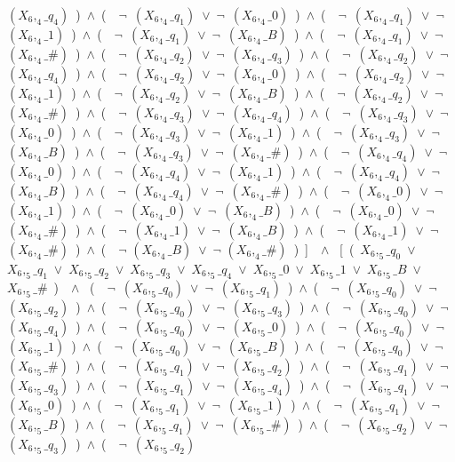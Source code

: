 ﻿\documentclass[a4paper,10pt]{article}
\begin{document}
$(X_6,_4\_q_4)$\ )\ $\wedge$\ (\ \ $\neg$\ $(X_6,_4\_q_1)$\ $\vee$\ $\neg$\ $(X_6,_4\_0)$\ )\ $\wedge$\ (\ \ $\neg$\ $(X_6,_4\_q_1)$\ $\vee$\ $\neg$\ $(X_6,_4\_1)$\ )\ $\wedge$\ (\ \ $\neg$\ $(X_6,_4\_q_1)$\ $\vee$\ $\neg$\ $(X_6,_4\_B)$\ )\ $\wedge$\ (\ \ $\neg$\ $(X_6,_4\_q_1)$\ $\vee$\ $\neg$\ $(X_6,_4\_\#)$\ )\ $\wedge$\ (\ \ $\neg$\ $(X_6,_4\_q_2)$\ $\vee$\ $\neg$\ $(X_6,_4\_q_3)$\ )\ $\wedge$\ (\ \ $\neg$\ $(X_6,_4\_q_2)$\ $\vee$\ $\neg$\ $(X_6,_4\_q_4)$\ )\ $\wedge$\ (\ \ $\neg$\ $(X_6,_4\_q_2)$\ $\vee$\ $\neg$\ $(X_6,_4\_0)$\ )\ $\wedge$\ (\ \ $\neg$\ $(X_6,_4\_q_2)$\ $\vee$\ $\neg$\ $(X_6,_4\_1)$\ )\ $\wedge$\ (\ \ $\neg$\ $(X_6,_4\_q_2)$\ $\vee$\ $\neg$\ $(X_6,_4\_B)$\ )\ $\wedge$\ (\ \ $\neg$\ $(X_6,_4\_q_2)$\ $\vee$\ $\neg$\ $(X_6,_4\_\#)$\ )\ $\wedge$\ (\ \ $\neg$\ $(X_6,_4\_q_3)$\ $\vee$\ $\neg$\ $(X_6,_4\_q_4)$\ )\ $\wedge$\ (\ \ $\neg$\ $(X_6,_4\_q_3)$\ $\vee$\ $\neg$\ $(X_6,_4\_0)$\ )\ $\wedge$\ (\ \ $\neg$\ $(X_6,_4\_q_3)$\ $\vee$\ $\neg$\ $(X_6,_4\_1)$\ )\ $\wedge$\ (\ \ $\neg$\ $(X_6,_4\_q_3)$\ $\vee$\ $\neg$\ $(X_6,_4\_B)$\ )\ $\wedge$\ (\ \ $\neg$\ $(X_6,_4\_q_3)$\ $\vee$\ $\neg$\ $(X_6,_4\_\#)$\ )\ $\wedge$\ (\ \ $\neg$\ $(X_6,_4\_q_4)$\ $\vee$\ $\neg$\ $(X_6,_4\_0)$\ )\ $\wedge$\ (\ \ $\neg$\ $(X_6,_4\_q_4)$\ $\vee$\ $\neg$\ $(X_6,_4\_1)$\ )\ $\wedge$\ (\ \ $\neg$\ $(X_6,_4\_q_4)$\ $\vee$\ $\neg$\ $(X_6,_4\_B)$\ )\ $\wedge$\ (\ \ $\neg$\ $(X_6,_4\_q_4)$\ $\vee$\ $\neg$\ $(X_6,_4\_\#)$\ )\ $\wedge$\ (\ \ $\neg$\ $(X_6,_4\_0)$\ $\vee$\ $\neg$\ $(X_6,_4\_1)$\ )\ $\wedge$\ (\ \ $\neg$\ $(X_6,_4\_0)$\ $\vee$\ $\neg$\ $(X_6,_4\_B)$\ )\ $\wedge$\ (\ \ $\neg$\ $(X_6,_4\_0)$\ $\vee$\ $\neg$\ $(X_6,_4\_\#)$\ )\ $\wedge$\ (\ \ $\neg$\ $(X_6,_4\_1)$\ $\vee$\ $\neg$\ $(X_6,_4\_B)$\ )\ $\wedge$\ (\ \ $\neg$\ $(X_6,_4\_1)$\ $\vee$\ $\neg$\ $(X_6,_4\_\#)$\ )\ $\wedge$\ (\ \ $\neg$ $(X_6,_4\_B)$\ $\vee$\ $\neg$ $(X_6,_4\_\#)$\ )\ ]\ \ $\wedge$ \ [\ (\ $X_6,_5\_q_0$\ $\vee$\ $X_6,_5\_q_1$\ $\vee$\ $X_6,_5\_q_2$\ $\vee$\ $X_6,_5\_q_3$\ $\vee$\ $X_6,_5\_q_4$\ $\vee$\ $X_6,_5\_0$\ $\vee$\ $X_6,_5\_1$\ $\vee$\ $X_6,_5\_B$\ $\vee$\ $X_6,_5\_\#$\ )\ \ $\wedge$ \ (\ \ $\neg$\ $(X_6,_5\_q_0)$\ $\vee$\ $\neg$\ $(X_6,_5\_q_1)$\ )\ $\wedge$\ (\ \ $\neg$\ $(X_6,_5\_q_0)$\ $\vee$\ $\neg$\ $(X_6,_5\_q_2)$\ )\ $\wedge$\ (\ \ $\neg$\ $(X_6,_5\_q_0)$\ $\vee$\ $\neg$\ $(X_6,_5\_q_3)$\ )\ $\wedge$\ (\ \ $\neg$\ $(X_6,_5\_q_0)$\ $\vee$\ $\neg$\ $(X_6,_5\_q_4)$\ )\ $\wedge$\ (\ \ $\neg$\ $(X_6,_5\_q_0)$\ $\vee$\ $\neg$\ $(X_6,_5\_0)$\ )\ $\wedge$\ (\ \ $\neg$\ $(X_6,_5\_q_0)$\ $\vee$\ $\neg$\ $(X_6,_5\_1)$\ )\ $\wedge$\ (\ \ $\neg$\ $(X_6,_5\_q_0)$\ $\vee$\ $\neg$\ $(X_6,_5\_B)$\ )\ $\wedge$\ (\ \ $\neg$\ $(X_6,_5\_q_0)$\ $\vee$\ $\neg$\ $(X_6,_5\_\#)$\ )\ $\wedge$\ (\ \ $\neg$\ $(X_6,_5\_q_1)$\ $\vee$\ $\neg$\ $(X_6,_5\_q_2)$\ )\ $\wedge$\ (\ \ $\neg$\ $(X_6,_5\_q_1)$\ $\vee$\ $\neg$\ $(X_6,_5\_q_3)$\ )\ $\wedge$\ (\ \ $\neg$\ $(X_6,_5\_q_1)$\ $\vee$\ $\neg$\ $(X_6,_5\_q_4)$\ )\ $\wedge$\ (\ \ $\neg$\ $(X_6,_5\_q_1)$\ $\vee$\ $\neg$\ $(X_6,_5\_0)$\ )\ $\wedge$\ (\ \ $\neg$\ $(X_6,_5\_q_1)$\ $\vee$\ $\neg$\ $(X_6,_5\_1)$\ )\ $\wedge$\ (\ \ $\neg$\ $(X_6,_5\_q_1)$\ $\vee$\ $\neg$\ $(X_6,_5\_B)$\ )\ $\wedge$\ (\ \ $\neg$\ $(X_6,_5\_q_1)$\ $\vee$\ $\neg$\ $(X_6,_5\_\#)$\ )\ $\wedge$\ (\ \ $\neg$\ $(X_6,_5\_q_2)$\ $\vee$\ $\neg$\ $(X_6,_5\_q_3)$\ )\ $\wedge$\ (\ \ $\neg$\ $(X_6,_5\_q_2)$\ 
\end{document}
